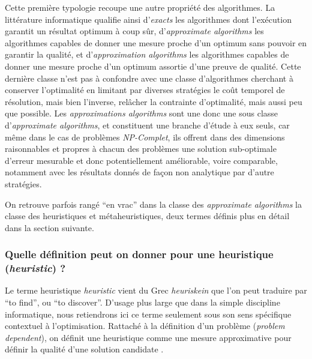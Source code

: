 Cette première typologie recoupe une autre propriété des algorithmes. La littérature informatique qualifie ainsi d'\textit{exacts} les algorithmes dont l'exécution garantit un résultat optimum à coup sûr, d'\textit{approximate algorithms} les algorithmes capables de donner une mesure proche d'un optimum sans pouvoir en garantir la qualité, et d'\textit{approximation algorithms} les algorithmes capables de donner une mesure proche d'un optimum assortie d'une preuve de qualité. Cette dernière classe n'est pas à confondre avec une classe d'algorithmes cherchant à conserver l'optimalité en limitant par diverses stratégies le coût temporel de résolution, mais bien l'inverse, relâcher la contrainte d'optimalité, mais aussi peu que possible. Les \textit{approximations algorithms} sont une donc une sous classe d'\textit{approximate algorithms}, et constituent une branche d'étude à eux seuls, car même dans le cas de problèmes \textit{NP-Complet}, ils offrent dans des dimensions raisonnables et propres à chacun des problèmes une solution sub-optimale d'erreur mesurable et donc potentiellement améliorable, voire comparable, notamment avec les résultats donnés de façon non analytique par d'autre stratégies.

On retrouve parfois rangé \enquote{en vrac} dans la classe des \textit{approximate algorithms} la classe des heuristiques et métaheuristiques, deux termes définis plus en détail dans la section suivante.


\subsubsection{Quelle définition peut on donner pour une heuristique (\textit{heuristic}) ? }
\label{ssec:heuristique}

Le terme heuristique \textit{heuristic} vient du Grec \textit{heuriskein} que l'on peut traduire par \foreignquote{english}{to find}, ou \foreignquote{english}{to discover}. D'usage plus large que dans la simple discipline informatique, nous retiendrons ici ce terme seulement sous son sens spécifique contextuel à l'optimisation. Rattaché à la définition d'un problème (\textit{problem dependent}), on définit une heuristique comme une mesure approximative pour définir la qualité d'une solution candidate \autocite[34]{Weise2011}.

